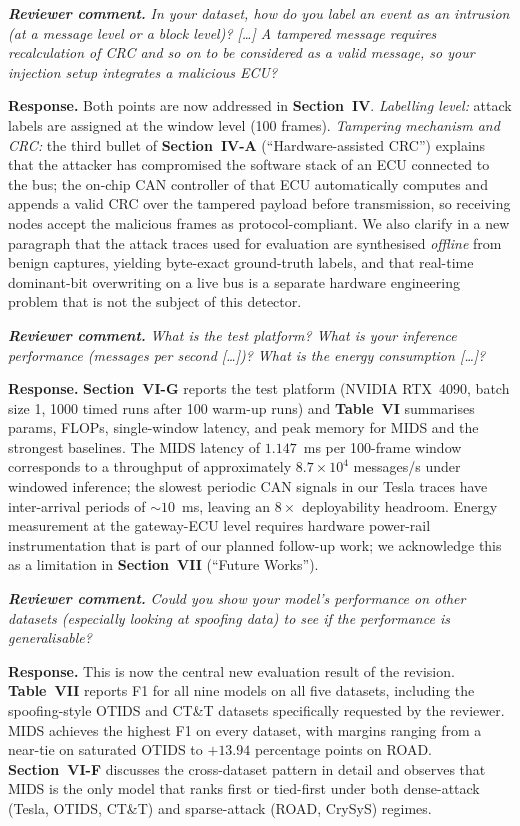 \documentclass[11pt,a4paper]{article}
\newcommand{\rcomment}[1]{%
  \par\medskip
  \begingroup
  \itshape
  \textbf{Reviewer comment.}\,\,#1
  \endgroup
  \par
}
\newcommand{\rresponse}[1]{%
  \par
  \begingroup
  \color{NavyBlue}
  \textbf{Response.}\,\,#1
  \endgroup
  \par\medskip
}
\newcommand{\xref}[1]{\textbf{#1}}
\begin{document}
\rcomment{In your dataset, how do you label an event as an
intrusion (at a message level or a block level)? [\dots] A tampered
message requires recalculation of CRC and so on to be considered
as a valid message, so your injection setup integrates a
malicious ECU?}
\rresponse{Both points are now addressed in \xref{Section~IV}.
\emph{Labelling level:} attack labels are assigned at the
window level (100 frames). \emph{Tampering mechanism and CRC:}
the third bullet of \xref{Section~IV-A} (``Hardware-assisted
CRC'') explains that the attacker has compromised the software
stack of an ECU connected to the bus; the on-chip CAN controller
of that ECU automatically computes and appends a valid CRC over
the tampered payload before transmission, so receiving nodes
accept the malicious frames as protocol-compliant. We also
clarify in a new paragraph that the attack traces used for
evaluation are synthesised \emph{offline} from benign captures,
yielding byte-exact ground-truth labels, and that real-time
dominant-bit overwriting on a live bus is a separate hardware
engineering problem that is not the subject of this detector.}

\rcomment{What is the test platform? What is your inference
performance (messages per second [\dots])? What is the energy
consumption [\dots]?}
\rresponse{\xref{Section~VI-G} reports the test platform (NVIDIA
RTX~4090, batch size 1, 1000 timed runs after 100 warm-up runs)
and \xref{Table~VI} summarises params, FLOPs, single-window
latency, and peak memory for MIDS and the strongest baselines.
The MIDS latency of $1.147$~ms per 100-frame window corresponds
to a throughput of approximately $8.7\times 10^{4}$ messages/s
under windowed inference; the slowest periodic CAN signals in
our Tesla traces have inter-arrival periods of $\sim 10$~ms,
leaving an $8\times$ deployability headroom. Energy measurement
at the gateway-ECU level requires hardware power-rail
instrumentation that is part of our planned follow-up work; we
acknowledge this as a limitation in \xref{Section~VII} (``Future
Works'').}

\rcomment{Could you show your model's performance on other
datasets (especially looking at spoofing data) to see if the
performance is generalisable?}
\rresponse{This is now the central new evaluation result of the
revision. \xref{Table~VII} reports F1 for all nine models on all
five datasets, including the spoofing-style OTIDS and CT\&T
datasets specifically requested by the reviewer. MIDS achieves
the highest F1 on every dataset, with margins ranging from a
near-tie on saturated OTIDS to $+13.94$ percentage points on
ROAD. \xref{Section~VI-F} discusses the cross-dataset pattern in
detail and observes that MIDS is the only model that ranks first
or tied-first under both dense-attack (Tesla, OTIDS, CT\&T) and
sparse-attack (ROAD, CrySyS) regimes.}
\end{document}
